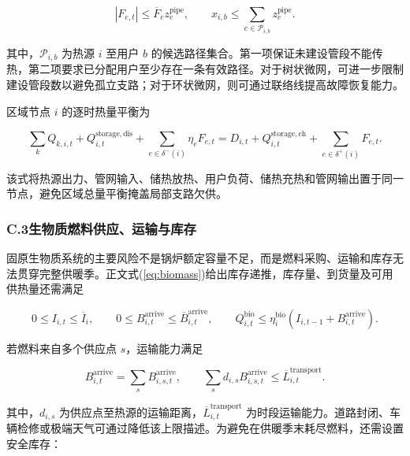 \begin{equation}
|F_{e,t}|\leq\overline F_ez_e^{\mathrm{pipe}},
\qquad
x_{i,b}\leq\sum_{e\in\mathcal P_{i,b}}z_e^{\mathrm{pipe}}.
\label{eq:guyuan_connectivity}
\end{equation}

其中，$\mathcal P_{i,b}$ 为热源 $i$ 至用户 $b$ 的候选路径集合。第一项保证未建设管段不能传热，第二项要求已分配用户至少存在一条有效路径。对于树状微网，可进一步限制建设管段数以避免孤立支路；对于环状微网，则可通过联络线提高故障恢复能力。

区域节点 $i$ 的逐时热量平衡为

\begin{equation}
\sum_kQ_{k,i,t}+Q_{i,t}^{\mathrm{storage,dis}}
+\sum_{e\in\delta^-(i)}\eta_eF_{e,t}
=D_{i,t}+Q_{i,t}^{\mathrm{storage,ch}}+\sum_{e\in\delta^+(i)}F_{e,t}.
\label{eq:guyuan_node_balance}
\end{equation}

该式将热源出力、管网输入、储热放热、用户负荷、储热充热和管网输出置于同一节点，避免区域总量平衡掩盖局部支路欠供。

\subsubsection*{C.3\quad 生物质燃料供应、运输与库存}

固原生物质系统的主要风险不是锅炉额定容量不足，而是燃料采购、运输和库存无法贯穿完整供暖季。正文式(\ref{eq:biomass})给出库存递推，库存量、到货量及可用供热量还需满足

\begin{equation}
0\leq I_{i,t}\leq\overline I_i,
\qquad
0\leq B_{i,t}^{\mathrm{arrive}}\leq\overline B_{i,t}^{\mathrm{arrive}},
\qquad
Q_{i,t}^{\mathrm{bio}}\leq\eta_i^{\mathrm{bio}}(I_{i,t-1}+B_{i,t}^{\mathrm{arrive}}).
\label{eq:biomass_limit}
\end{equation}

若燃料来自多个供应点 $s$，运输能力满足

\begin{equation}
B_{i,t}^{\mathrm{arrive}}=\sum_sB_{i,s,t}^{\mathrm{arrive}},
\qquad
\sum_s d_{i,s}B_{i,s,t}^{\mathrm{arrive}}\leq\overline L_{i,t}^{\mathrm{transport}}.
\label{eq:biomass_transport}
\end{equation}

其中，$d_{i,s}$ 为供应点至热源的运输距离，$\overline L_{i,t}^{\mathrm{transport}}$ 为时段运输能力。道路封闭、车辆检修或极端天气可通过降低该上限描述。为避免在供暖季末耗尽燃料，还需设置安全库存：

